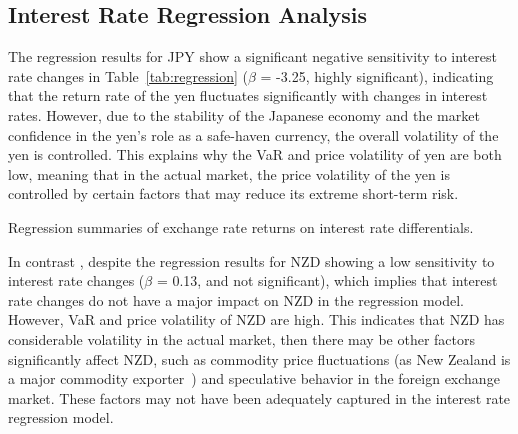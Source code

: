 \documentclass{article}
\begin{document}
\subsection{Interest Rate Regression Analysis}
The regression results for JPY show a significant negative sensitivity to interest rate changes in Table~\ref{tab:regression} ($\beta$ = -3.25, highly significant), indicating that the return rate of the yen fluctuates significantly with changes in interest rates. However, due to the stability of the Japanese economy and the market confidence in the yen's role as a safe-haven currency, the overall volatility of the yen is controlled. This explains why the VaR and price volatility of yen are both low, meaning that in the actual market, the price volatility of the yen is controlled by certain factors that may reduce its extreme short-term risk.

\begin{table}[h]
\centering
\caption{Regression summaries of exchange rate returns on interest rate differentials.} 
\label{tab:regression}
\end{table}
In contrast , despite the regression results for NZD showing a low sensitivity to interest rate changes ($\beta$ = 0.13, and not significant), which implies that interest rate changes do not have a major impact on NZD in the regression model. However, VaR and price volatility of NZD are high. This indicates that NZD has considerable volatility in the actual market, then there may be other factors significantly affect NZD, such as commodity price fluctuations (as New Zealand is a major commodity exporter~\cite{blundell1990exchange}) and speculative behavior in the foreign exchange market. These factors may not have been adequately captured in the interest rate regression model.
\end{document}
